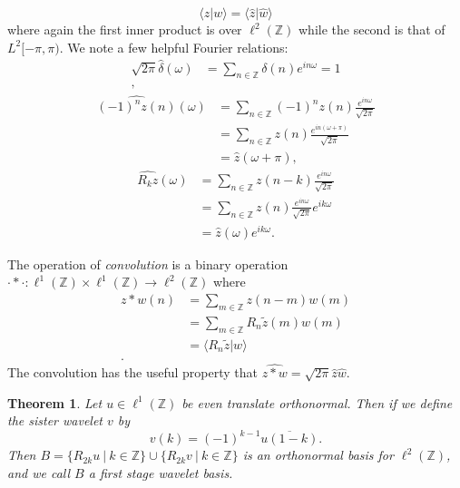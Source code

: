 \documentclass{report}
\newtheorem{thm:ellwave}{Theorem}
\newcommand{\Z}{\mathbb{Z}}
\begin{document}
$$
\langle z|w \rangle=\langle \hat z | \hat w \rangle
$$
where again the first inner product is over $\ell^2 (\Z)$ while the second is that of $L^2 [-\pi,\pi)$. We note a few helpful Fourier relations:
\begin{align*}
\sqrt{2\pi}\hat \delta (\omega)&= \sum_{n\in \Z}\delta(n) e^{in\omega}=1\\ ,
\end{align*}
\begin{align*}
\widehat{(-1)^n z(n)}(\omega)&= \sum_{n\in \Z}(-1)^n z(n) \frac{e^{in\omega}}{\sqrt{2 \pi}}\\
&= \sum_{n\in \Z}z(n) \frac{e^{in(\omega+\pi)}}{\sqrt{2\pi}}\\
&= \hat z {(\omega+\pi)},
\end{align*}
\begin{align*}
\widehat{R_k z}(\omega)&= \sum_{n\in \Z}z(n-k) \frac{e^{in\omega}}{\sqrt{2\pi}}\\
&= \sum_{n\in \Z}z(n) \frac{e^{in\omega}}{\sqrt{2\pi}}e^{ik\omega}\\
&= \hat z {(\omega)}e^{ik\omega}.
\end{align*}


The operation of \emph{convolution} is a binary operation  $\cdot \ast \cdot : \ell^1(\Z) \times \ell^1(\Z) \to \ell^2 (\Z)$ where
\begin{align*}
z \ast w (n) & =\sum_{m \in \Z} z(n-m)w(m)\\
& =\sum_{m \in \Z} R_n \tilde z(m)w(m)\\
& =\langle R_n \tilde z| w \rangle \\.
\end{align*}
The convolution has the useful property that $\widehat{z \ast w}=\sqrt{2\pi}\hat z \hat w$. 

\begin{thm:ellwave}
\label{thm:ellwave}
Let $u \in \ell^1 (\Z)$ be even translate orthonormal. Then if we define the sister wavelet $v$ by
$$
v(k)=(-1)^{k-1}\overline{u(1-k)}.
$$
Then $B=\{R_{2k}u \ | \ k \in \Z \}\cup\{R_{2k}v \ | \ k \in \Z \}$ is an orthonormal basis for $\ell^2 (\Z)$, and we call $B$ a first stage wavelet basis.
\end{thm:ellwave}
\end{document}
